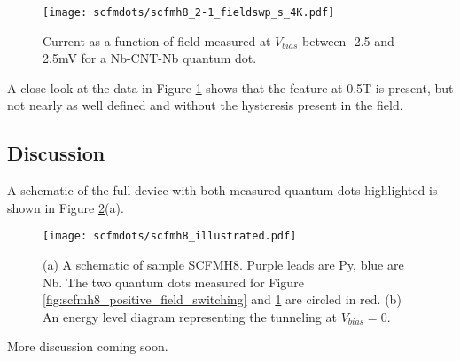 \begin{figure}
    \centering
    \texttt{[image: scfmdots/scfmh8\_2-1\_fieldswp\_s\_4K.pdf]}
    \caption{Current as a function of field measured at $V_{bias}$ between -2.5 and 2.5mV for a Nb-CNT-Nb quantum dot. }
    \label{fig:scfmh8_all_superconducting}
\end{figure}

A close look at the data in Figure \ref{fig:scfmh8_all_superconducting} shows that the feature at 0.5T is present, but not nearly as well defined and without the hysteresis present in the field.

\subsection{Discussion}

A schematic of the full device with both measured quantum dots highlighted is shown in Figure \ref{fig:scfmh8_illustration}(a). 

\begin{figure}
    \centering
    \texttt{[image: scfmdots/scfmh8\_illustrated.pdf]}
    \caption{(a) A schematic of sample SCFMH8. Purple leads are Py, blue are Nb. The two quantum dots measured for Figure \ref{fig:scfmh8_positive_field_switching} and \ref{fig:scfmh8_all_superconducting} are circled in red. (b) An energy level diagram representing the tunneling at $V_{bias}=0$.}
    \label{fig:scfmh8_illustration}
\end{figure}

More discussion coming soon.